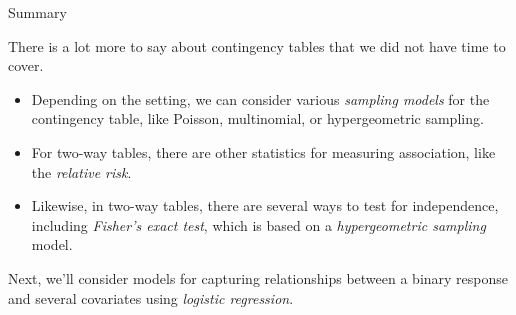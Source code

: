 \documentclass[aspectratio=169]{beamer}
\begin{document}
      
  \begin{frame}[t,allowframebreaks]{Summary}\label{conclusion}
  
  There is a lot more to say about contingency tables that we did not have
  time to cover. 
  \begin{itemize}
      \item Depending on the setting, we can consider various 
      \textit{sampling models} for the contingency table, 
      like Poisson, multinomial, or hypergeometric sampling.
      \item For two-way tables, there are other statistics for
  measuring association, like the \emph{relative risk}. 
      \item Likewise, in
  two-way tables, there are several ways to test for independence,
  including \emph{Fisher's exact test}, which is based on a
  \emph{hypergeometric sampling} model. 
  \end{itemize}
  Next, we'll consider models for
  capturing relationships between a binary response and several covariates
  using \emph{logistic regression}.
  
  \end{frame}
\end{document}
